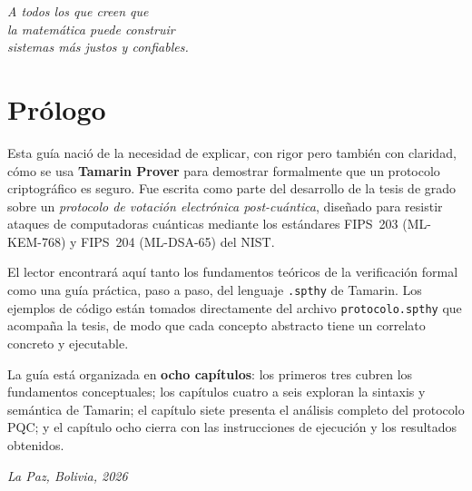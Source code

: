 \documentclass[12pt, a4paper, twoside, openright]{book}
\begin{document}
\newpage\thispagestyle{empty}\null\newpage

\thispagestyle{empty}
\vspace*{5cm}
\begin{flushright}
  \itshape\large
  A todos los que creen que\\
  la matem\'atica puede construir\\
  sistemas m\'as justos y confiables.
\end{flushright}
\newpage

\chapter*{Pr\'ologo}

Esta gu\'ia naci\'o de la necesidad de explicar, con rigor pero
tambi\'en con claridad, c\'omo se usa \textbf{Tamarin Prover} para
demostrar formalmente que un protocolo criptogr\'afico es seguro.
Fue escrita como parte del desarrollo de la tesis de grado sobre un
\textit{protocolo de votaci\'on electr\'onica post-cu\'antica},
dise\~nado para resistir ataques de computadoras cu\'anticas mediante
los est\'andares FIPS~203 (ML-KEM-768) y FIPS~204 (ML-DSA-65) del NIST.

\medskip

El lector encontrar\'a aqu\'i tanto los fundamentos te\'oricos de la
verificaci\'on formal como una gu\'ia pr\'actica, paso a paso, del
lenguaje \texttt{.spthy} de Tamarin. Los ejemplos de c\'odigo est\'an
tomados directamente del archivo \texttt{protocolo.spthy} que acompa\~na
la tesis, de modo que cada concepto abstracto tiene un correlato
concreto y ejecutable.

\medskip

\noindent La gu\'ia est\'a organizada en \textbf{ocho cap\'itulos}:
los primeros tres cubren los fundamentos conceptuales; los cap\'itulos
cuatro a seis exploran la sintaxis y sem\'antica de Tamarin; el
cap\'itulo siete presenta el an\'alisis completo del protocolo PQC;
y el cap\'itulo ocho cierra con las instrucciones de ejecuci\'on y
los resultados obtenidos.

\medskip\noindent
\textit{La Paz, Bolivia, 2026}

\tableofcontents
\listoffigures
\listoftables

\end{document}
